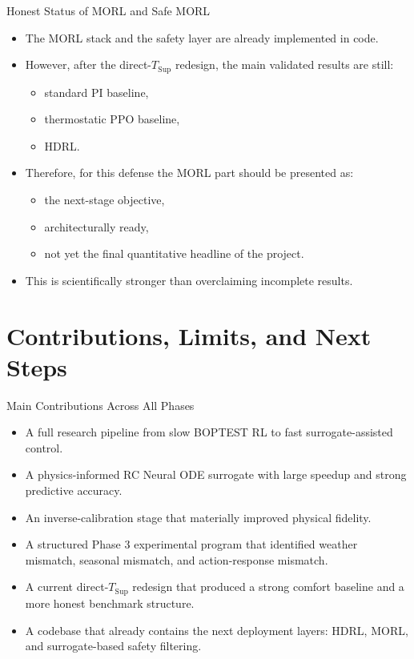 \documentclass[aspectratio=169,11pt]{beamer}
\begin{document}
\begin{frame}{Honest Status of MORL and Safe MORL}
  \begin{itemize}
    \item The MORL stack and the safety layer are already implemented in code.
    \item However, after the direct-$T_{\mathrm{Sup}}$ redesign, the main validated results are still:
    \begin{itemize}
      \item standard PI baseline,
      \item thermostatic PPO baseline,
      \item HDRL.
    \end{itemize}
    \item Therefore, for this defense the MORL part should be presented as:
    \begin{itemize}
      \item the next-stage objective,
      \item architecturally ready,
      \item not yet the final quantitative headline of the project.
    \end{itemize}
    \item This is scientifically stronger than overclaiming incomplete results.
  \end{itemize}
\end{frame}

\section{Contributions, Limits, and Next Steps}

\begin{frame}{Main Contributions Across All Phases}
  \begin{itemize}
    \item A full research pipeline from slow BOPTEST RL to fast surrogate-assisted control.
    \item A physics-informed RC Neural ODE surrogate with large speedup and strong predictive accuracy.
    \item An inverse-calibration stage that materially improved physical fidelity.
    \item A structured Phase 3 experimental program that identified weather mismatch, seasonal mismatch, and action-response mismatch.
    \item A current direct-$T_{\mathrm{Sup}}$ redesign that produced a strong comfort baseline and a more honest benchmark structure.
    \item A codebase that already contains the next deployment layers: HDRL, MORL, and surrogate-based safety filtering.
  \end{itemize}
\end{frame}
\end{document}
